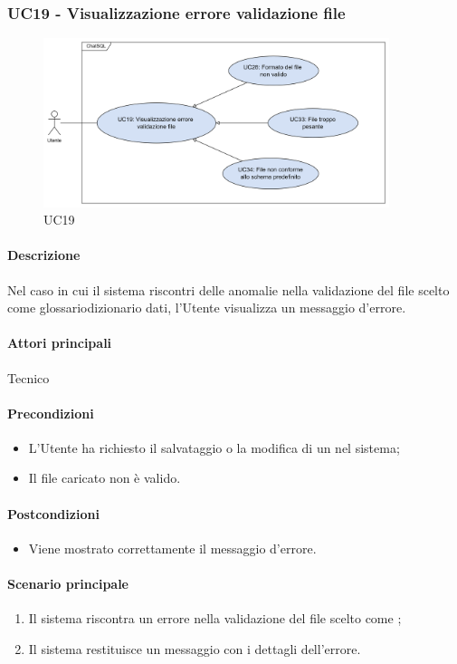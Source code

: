 \subsubsection{UC19 - Visualizzazione errore validazione file}\label{UC19}

\begin{figure}[H]
  \centering
  \includegraphics[width=0.90\textwidth]{assets/uc19.png}
  \caption{UC19}
\end{figure}

\paragraph*{Descrizione}
Nel caso in cui il sistema riscontri delle anomalie nella validazione del file scelto come glossario{dizionario dati}, l'Utente visualizza un messaggio d'errore.

\paragraph*{Attori principali}
Tecnico

\paragraph*{Precondizioni}
\begin{itemize}
  \item L'Utente ha richiesto il salvataggio o la modifica di un  nel sistema;
  \item Il file caricato non è valido.
\end{itemize}

\paragraph*{Postcondizioni}
\begin{itemize}
  \item Viene mostrato correttamente il messaggio d'errore.
\end{itemize}

\paragraph*{Scenario principale}
\begin{enumerate}
  \item Il sistema riscontra un errore nella validazione del file scelto come ;
  \item Il sistema restituisce un messaggio con i dettagli dell'errore. 
\end{enumerate}